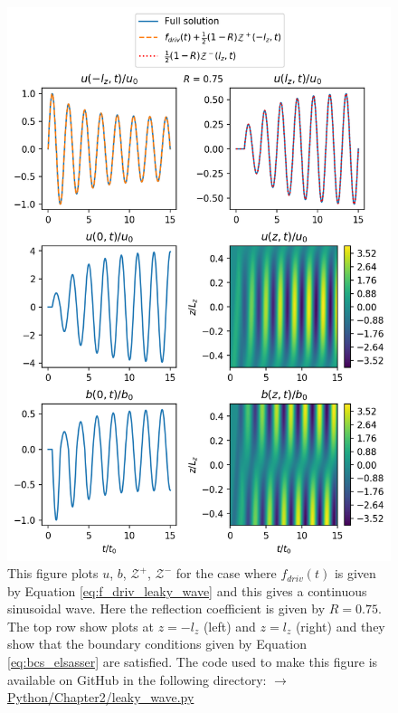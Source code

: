 \begin{figure}
    \centering
    \vspace{-20pt}
    \includegraphics[width=\textwidth,height=0.85\textheight,keepaspectratio]{figures/chapter02/leaky_wave.png}
    \vspace{-10pt}
    \caption{This figure plots $u$, $b$, $\mathcal{Z}^{+}$, $\mathcal{Z^{-}}$ for the case where $f_{driv}(t)$ is given by Equation \eqref{eq:f_driv_leaky_wave} and this gives a continuous sinusoidal wave. Here the reflection coefficient is given by $R=0.75$. The top row show plots at $z=-l_z$ (left) and $z=l_z$ (right) and they show that the boundary conditions given by Equation \eqref{eq:bcs_elsasser} are satisfied. The code used to make this figure is available on GitHub in the following directory:\newline
    \href{https://github.com/aleksyprok/apkp_thesis/blob/main/Python/Chapter2/leaky_wave.py}{$\rightarrow$ Python/Chapter2/leaky\_wave.py}}
    \vspace{-30pt}
    \label{fig:leaky_wave}
\end{figure}

